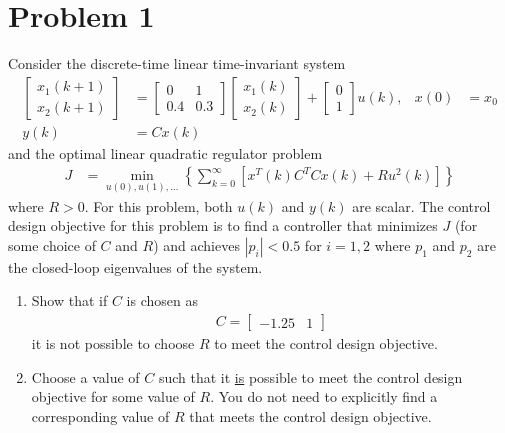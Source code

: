 \section*{Problem 1}

Consider the discrete-time linear time-invariant system
\begin{align*}
    \begin{bmatrix}
            x_1(k+1) \\
            x_2(k+1)
        \end{bmatrix} & = \begin{bmatrix}
            0 & 1 \\
            0.4 & 0.3
        \end{bmatrix} \begin{bmatrix}
            x_1(k) \\
            x_2(k)
        \end{bmatrix} + \begin{bmatrix}
            0 \\
            1
        \end{bmatrix} u(k),
        & x(0) & = x_0 \\
    y(k) & = Cx(k)
\end{align*}
and the optimal linear quadratic regulator problem
\begin{align*}
    J & = \min_{u(0),u(1),\ldots} \left\{ \sum_{k=0}^\infty \left[ x^T(k) C^T Cx(k) + R u^2(k) \right] \right\}
\end{align*}
where $R > 0$. For this problem, both $u(k)$ and $y(k)$ are scalar. The control design objective for this problem is to find a controller that minimizes $J$ (for some choice of $C$ and $R$) and achieves $|p_i|<0.5$ for $i=1,2$ where $p_1$ and $p_2$ are the closed-loop eigenvalues of the system.

\begin{enumerate}
    \item
    Show that if $C$ is chosen as
    \begin{align*}
        C = \begin{bmatrix}
                -1.25 & 1
            \end{bmatrix}
    \end{align*}
    it is not possible to choose $R$ to meet the control design objective.

    \item
    Choose a value of $C$ such that it \underline{is} possible to meet the control design objective for some value of $R$. You do not need to explicitly find a corresponding value of $R$ that meets the control design objective.

    
\end{enumerate}



